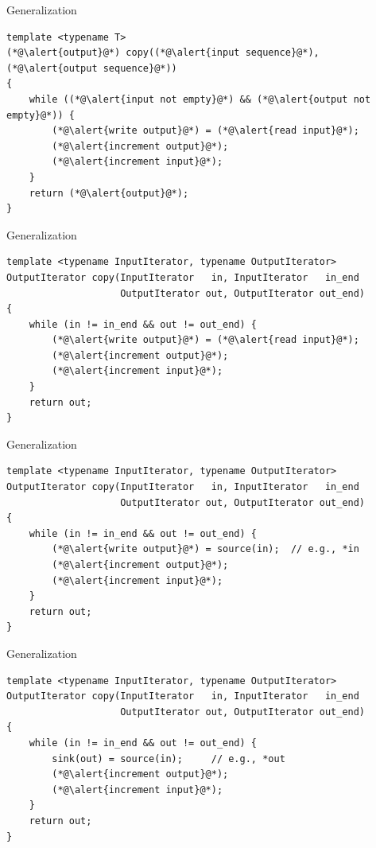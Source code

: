 \documentclass[aspectratio=169]{beamer}
\begin{document}

\begin{frame}[fragile]{Generalization}
\begin{lstlisting}
template <typename T>
(*@\alert{output}@*) copy((*@\alert{input sequence}@*), (*@\alert{output sequence}@*))
{
    while ((*@\alert{input not empty}@*) && (*@\alert{output not empty}@*)) {
        (*@\alert{write output}@*) = (*@\alert{read input}@*);
        (*@\alert{increment output}@*);
        (*@\alert{increment input}@*);
    }
    return (*@\alert{output}@*);
}
\end{lstlisting}
\end{frame}


\begin{frame}[fragile]{Generalization}
  \small
\begin{lstlisting}
template <typename InputIterator, typename OutputIterator>
OutputIterator copy(InputIterator   in, InputIterator   in_end
                    OutputIterator out, OutputIterator out_end)
{
    while (in != in_end && out != out_end) {
        (*@\alert{write output}@*) = (*@\alert{read input}@*);
        (*@\alert{increment output}@*);
        (*@\alert{increment input}@*);
    }
    return out;
}
\end{lstlisting}
\end{frame}


\begin{frame}[fragile]{Generalization}
  \small
\begin{lstlisting}
template <typename InputIterator, typename OutputIterator>
OutputIterator copy(InputIterator   in, InputIterator   in_end
                    OutputIterator out, OutputIterator out_end)
{
    while (in != in_end && out != out_end) {
        (*@\alert{write output}@*) = source(in);  // e.g., *in
        (*@\alert{increment output}@*);
        (*@\alert{increment input}@*);
    }
    return out;
}
\end{lstlisting}
\end{frame}


\begin{frame}[fragile]{Generalization}
  \small
\begin{lstlisting}
template <typename InputIterator, typename OutputIterator>
OutputIterator copy(InputIterator   in, InputIterator   in_end
                    OutputIterator out, OutputIterator out_end)
{
    while (in != in_end && out != out_end) {
        sink(out) = source(in);     // e.g., *out
        (*@\alert{increment output}@*);
        (*@\alert{increment input}@*);
    }
    return out;
}
\end{lstlisting}
\end{frame}
\end{document}
